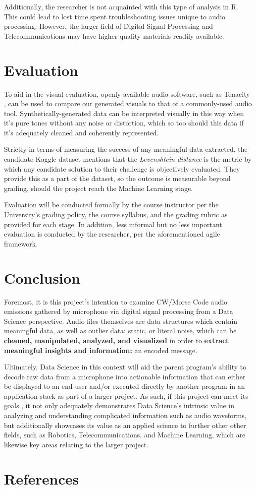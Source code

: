 \documentclass[11pt]{article}
\begin{document}
Additionally, the researcher is not acquainted with this type of analysis in R. This could lead to lost time spent troubleshooting issues unique to audio processing.
However, the larger field of Digital Signal Processing and Telecommunications may have higher-quality materials readily available.
\section{Evaluation}
\label{sec:org32d7c0c}
To aid in the visual evaluation, openly-available audio software, such as Tenacity \autocite{tenacityFOSS}, can be used to compare our generated
visuals to that of a commonly-used audio tool. Synthetically-generated data can be interpreted visually in this way when it's pure tones without any noise or distortion,
which so too should this data if it's adequately cleaned and coherently represented.

Strictly in terms of measuring the success of any meaningful data extracted, the candidate Kaggle dataset mentions that
the \emph{Levenshtein distance} is the metric by which any candidate solution to their challenge is objectively evaluated. They provide this
as a part of the dataset, so the outcome is measurable beyond grading, should the project reach the Machine Learning stage.

Evaluation will be conducted formally by the course instructor per the University's grading policy,
the course syllabus, and the grading rubric as provided for each stage. In addition, less informal but no less
important evaluation is conducted by the researcher, per the aforementioned agile framework.
\section{Conclusion}
\label{sec:orgc7dba0e}
Foremost, it is this project's intention to examine CW/Morse Code audio emissions gathered by microphone via digital signal processing
from a Data Science perspective. Audio files themselves are data structures which contain meaningful data, as well as outlier data: static, or literal noise, which can be
\textbf{cleaned, manipulated, analyzed, and visualized} in order to \textbf{extract meaningful insights and information:} an encoded message.

Ultimately, Data Science in this context will aid the parent program's ability to decode raw data from a microphone into actionable information that can either be displayed to an end-user
and/or executed directly by another program in an application stack as part of a larger project. As such, if this project can meet its goals , it not only adequately demonstrates
Data Science's intrinsic value in analyzing and understanding complicated information such as audio waveforms, but additionally showcases its value as an applied science to further other
other fields, such as Robotics, Telecommunications, and Machine Learning, which are likewise key areas relating to the larger project.
\section{References}
\label{sec:org2a4720c}
\printbibliography
\end{document}
